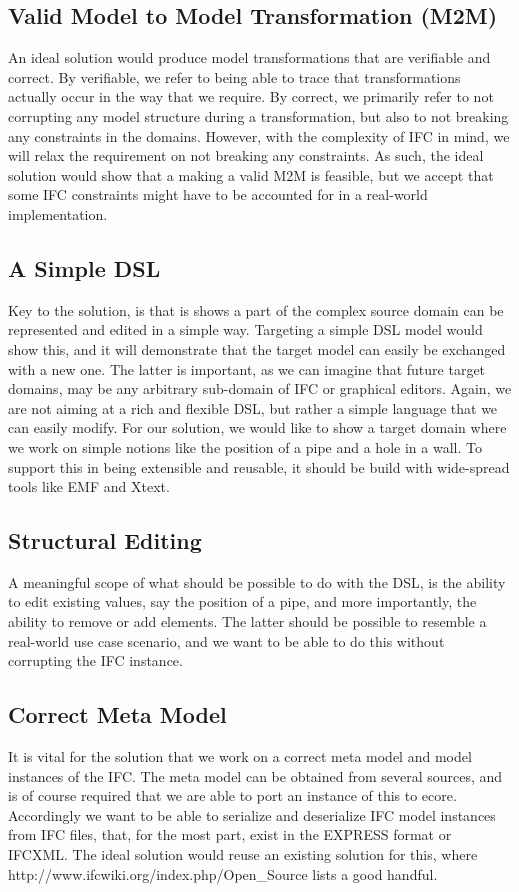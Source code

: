 \subsection{Valid Model to Model Transformation (M2M)}
An ideal solution would produce model transformations that are verifiable and correct. By verifiable, we refer to being able to trace that transformations actually occur in the way that we require. By correct, we primarily refer to not corrupting any model structure during a transformation, but also to not breaking any constraints in the domains. However, with the complexity of IFC in mind, we will relax the requirement on not breaking any constraints. As such, the ideal solution would show that a making a valid M2M is feasible, but we accept that some IFC constraints might have to be accounted for in a real-world implementation.

\subsection{A Simple DSL}
Key to the solution, is that is shows a part of the complex source domain can be represented and edited in a simple way. Targeting a simple DSL model would show this, and it will demonstrate that the target model can easily be exchanged with a new one. The latter is important, as we can imagine that future target domains, may be any arbitrary sub-domain of IFC or graphical editors. Again, we are not aiming at a rich and flexible DSL, but rather a simple language that we can easily modify. For our solution, we would like to show a target domain where we work on simple notions like the position of a pipe and a hole in a wall. To support this in being extensible and reusable, it should be build with wide-spread tools like EMF and Xtext.

\subsection{Structural Editing}
A meaningful scope of what should be possible to do with the DSL, is the ability to edit existing values, say the position of a pipe, and more importantly, the ability to remove or add elements. The latter should be possible to resemble a real-world use case scenario, and we want to be able to do this without corrupting the IFC instance.

\subsection{Correct Meta Model}
It is vital for the solution that we work on a correct meta model and model instances of the IFC. The meta model can be obtained from several sources,
and is of course required that we are able to port an instance of this to ecore. Accordingly we want to be able to serialize and deserialize IFC model instances from IFC files, that, for the most part, exist in the EXPRESS format or IFCXML. The ideal solution would reuse an existing solution for this, where http://www.ifcwiki.org/index.php/Open\_Source lists a good handful.


